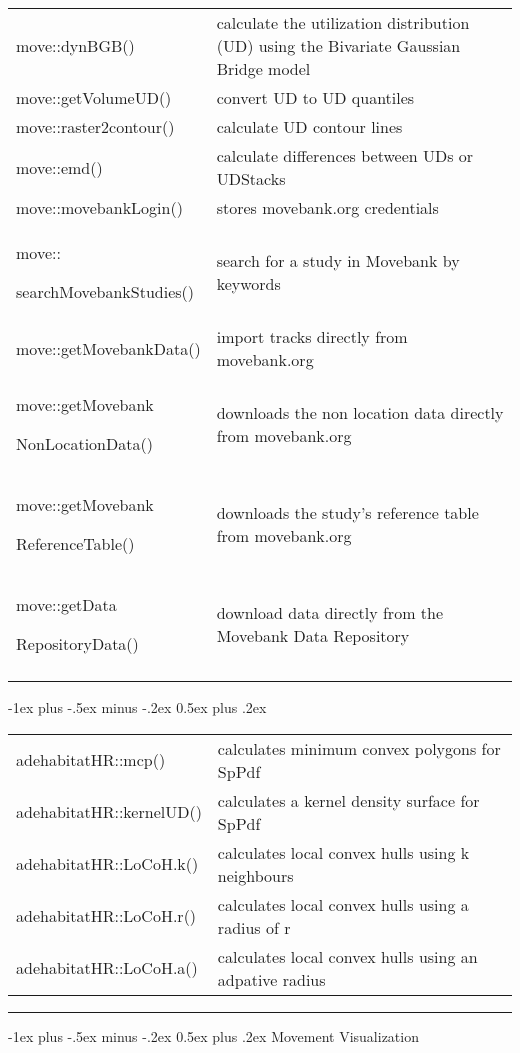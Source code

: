 \documentclass[a4paper,10pt,landscape]{article}
\makeatletter
\renewcommand{\section}{\@startsection{section}{1}{0mm}%
                                {-1ex plus -.5ex minus -.2ex}%
                                {0.5ex plus .2ex}%
                                {\normalfont\large\bfseries}}
\makeatother
\begin{document}
\begin{multicols}{3}
\begin{tabular}{@{}p{\the\MyLen}%
                @{}p{\linewidth-\the\MyLen}@{}}
move::dynBGB() &  calculate the utilization distribution (UD) using the Bivariate Gaussian Bridge model \\
move::getVolumeUD() & convert UD to UD quantiles \\
move::raster2contour() & calculate UD contour lines \\
move::emd() & calculate differences between UDs or UDStacks \\
move::movebankLogin() & stores movebank.org credentials \\
move::\par searchMovebankStudies() & search for a study in Movebank by keywords \\
move::getMovebankData() & import tracks directly from movebank.org \\
move::getMovebank\par
NonLocationData() & downloads the non location data directly from movebank.org \\
move::getMovebank\par
ReferenceTable() & downloads the study's reference table from movebank.org \\
move::getData\par
RepositoryData() & download data directly from the Movebank Data Repository \\
& 
\end{tabular}

\section{}
\begin{tabular}{@{}p{\the\MyLen}%
                @{}p{\linewidth-\the\MyLen}@{}}
adehabitatHR::mcp() & calculates minimum convex polygons for SpPdf \\
adehabitatHR::kernelUD() & calculates a kernel density surface for SpPdf \\
adehabitatHR::LoCoH.k() & calculates local convex hulls using k neighbours \\
adehabitatHR::LoCoH.r() & calculates local convex hulls using a radius of r \\
adehabitatHR::LoCoH.a() & calculates local convex hulls using an adpative radius \\
\end{tabular}


\quad
\rule{0.32\textwidth}{0.4pt}
\section{Movement Visualization}


\end{multicols}
\end{document}
